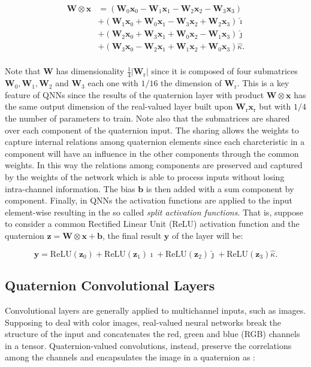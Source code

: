 \documentclass[graybox]{svmult}
\def\x{{\mathbf x}}														\def\q{{\mathbf q}}														\def\y{{\mathbf y}}														\def\z{{\mathbf z}}														\def\C{{\mathbf C}}														\def\E{\text{E}} 									\def\W{{\mathbf W}}														\def\ii{{\hat{\imath}}}												\def\ij{{\hat{\jmath}}}												\def\ik{{\hat{\kappa}}}												\def\bH{\mathbb{H}}														\def\bQ{\mathbb{Q}}														\def\bR{\mathbb{R}}														\def\cD{{\cal D}}															\def\cL{{\cal L}}															\def\cN{{\cal N}}															\newcommand{\beps}{\boldsymbol{\epsilon}}					  \newcommand{\bmu}{\boldsymbol{\mu}}					  \newcommand{\bphi}{\boldsymbol{\phi}}				  \newcommand{\bth}{\boldsymbol{\theta}}				\newcommand{\bsigma}{\boldsymbol{\sigma}} 		\newcommand{\bSigma}{\boldsymbol{\Sigma}} 		\newcommand{\tT}{^{\text{T}}} 								\newcommand{\tH}{^{\text{H}}} 								\DeclareMathOperator{\diag}{diag} 									\DeclareMathOperator{\Tr}{Tr}								\DeclareMathOperator{\var}{var}
\begin{document}
\begin{equation}
	\begin{split}
	\W \otimes \x &= \left(\W_{0}\x_{0} - \W_{1}\x_{1} - \W_{2}\x_{2} - \W_{3}\x_{3}\right)\\
	&+ \left(\W_{1}\x_{0} + \W_{0}\x_{1} - \W_{3}\x_{2} + \W_{2}\x_{3}\right)\ii \\
	&+ \left(\W_{2}\x_{0} + \W_{3}\x_{1} + \W_{0}\x_{2} - \W_{1}\x_{3}\right)\ij \\
	&+ \left(\W_{3}\x_{0} - \W_{2}\x_{1} + \W_{1}\x_{2} + \W_{0}\x_{3}\right)\ik. \\
    \end{split}
\label{eq:qmlp}
\end{equation}

Note that $\mathbf{W}$ has dimensionality $\frac{1}{4}|\mathbf{W}_{\text{r}}|$ since it is composed of four submatrices $\mathbf{W}_0, \mathbf{W}_1, \mathbf{W}_2$ and $\mathbf{W}_3$ each one with $1/16$ the dimension of $\mathbf{W}_{\text{r}}$. This is a key feature of QNNs since the results of the quaternion layer with product $\W \otimes \x$ has the same output dimension of the real-valued layer built upon $\W_{\text{r}} \mathbf{x}_{\text{r}}$ but with $1/4$ the number of parameters to train.
Note also that the submatrices are shared over each component of the quaternion input. The sharing allows the weights to capture internal relations among quaternion elements since each charcteristic in a component will have an influence in the other components through the common weights. In this way the relations among components are preserved and captured by the weights of the network which is able to process inputs without losing intra-channel information.
The bias $\mathbf{b}$ is then added with a sum component by component.
Finally, in QNNs the activation functions are applied to the input element-wise resulting in the so called \textit{split activation functions}. That is, suppose to consider a common Rectified Linear Unit (ReLU) activation function and the quaternion $\mathbf{z} = \W \otimes \x + \mathbf{b}$, the final result $\mathbf{y}$ of the layer will be:

\begin{equation}
    \mathbf{y} = \text{ReLU}(\mathbf{z}_0) + \text{ReLU}(\mathbf{z}_1) \ii + \text{ReLU}(\mathbf{z}_2) \ij + \text{ReLU}(\mathbf{z}_3) \ik.
\end{equation}


\subsection{Quaternion Convolutional Layers}
\label{sec:qconv}
\noindent Convolutional layers are generally applied to multichannel inputs, such as images. Supposing to deal with color images, real-valued neural networks break the structure of the input and concatenates the red, green and blue (RGB) channels in a tensor. Quaternion-valued convolutions, instead, preserve the correlations among the channels and encapsulates the image in a quaternion as \cite{ParcolletAIR2019, ParcolletICASSP2019a, QilinQCNN2019}:
\end{document}
